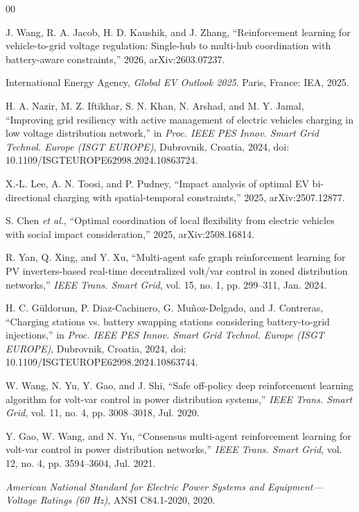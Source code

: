 \documentclass[conference,a4paper]{IEEEtran}
\begin{document}
\begin{thebibliography}{00}

 J. Wang, R. A. Jacob, H. D. Kaushik, and J. Zhang, ``Reinforcement
learning for vehicle-to-grid voltage regulation: Single-hub to multi-hub coordination with
battery-aware constraints,'' 2026, arXiv:2603.07237.

 International Energy Agency, \emph{Global EV Outlook 2025}. Paris, France:
IEA, 2025.

 H. A. Nazir, M. Z. Iftikhar, S. N. Khan, N. Arshad, and M. Y. Jamal,
``Improving grid resiliency with active management of electric vehicles charging in low
voltage distribution network,'' in \emph{Proc. IEEE PES Innov. Smart Grid Technol. Europe
(ISGT EUROPE)}, Dubrovnik, Croatia, 2024, doi: 10.1109/ISGTEUROPE62998.2024.10863724.

 X.-L. Lee, A. N. Toosi, and P. Pudney, ``Impact analysis of optimal EV
bi-directional charging with spatial-temporal constraints,'' 2025, arXiv:2507.12877.

 S. Chen \emph{et al.}, ``Optimal coordination of local flexibility from
electric vehicles with social impact consideration,'' 2025, arXiv:2508.16814.

 R. Yan, Q. Xing, and Y. Xu, ``Multi-agent safe graph reinforcement
learning for PV inverters-based real-time decentralized volt/var control in zoned
distribution networks,'' \emph{IEEE Trans. Smart Grid}, vol. 15, no. 1, pp. 299--311, Jan.
2024.

 H. C. G\"{u}ldorum, P. Diaz-Cachinero, G. Mu\~{n}oz-Delgado, and J.
Contreras, ``Charging stations vs. battery swapping stations considering battery-to-grid
injections,'' in \emph{Proc. IEEE PES Innov. Smart Grid Technol. Europe (ISGT EUROPE)},
Dubrovnik, Croatia, 2024, doi: 10.1109/ISGTEUROPE62998.2024.10863744.

 W. Wang, N. Yu, Y. Gao, and J. Shi, ``Safe off-policy deep
reinforcement learning algorithm for volt-var control in power distribution systems,''
\emph{IEEE Trans. Smart Grid}, vol. 11, no. 4, pp. 3008--3018, Jul. 2020.

 Y. Gao, W. Wang, and N. Yu, ``Consensus multi-agent reinforcement
learning for volt-var control in power distribution networks,'' \emph{IEEE Trans. Smart
Grid}, vol. 12, no. 4, pp. 3594--3604, Jul. 2021.

 \emph{American National Standard for Electric Power Systems and Equipment---
Voltage Ratings (60 Hz)}, ANSI C84.1-2020, 2020.


\end{thebibliography}
\end{document}
